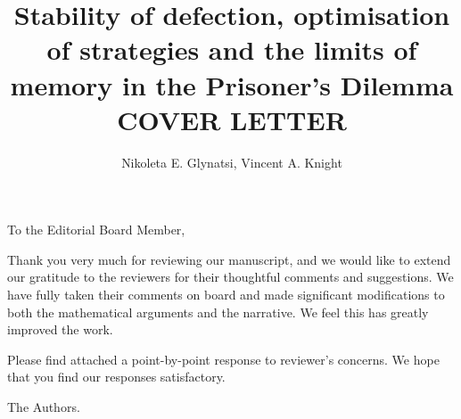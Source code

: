 \documentclass{article}
\title{Stability of defection, optimisation of strategies and the limits of
memory in the Prisoner's Dilemma COVER LETTER}
\author{Nikoleta E. Glynatsi, Vincent A. Knight}
\begin{document}
\maketitle

To the Editorial Board Member,

Thank you very much for reviewing our manuscript, and we would like to extend
our gratitude to the reviewers for their thoughtful comments and suggestions. We
have fully taken their comments on board and made significant modifications to
both the mathematical arguments and the narrative. We feel this has greatly
improved the work.

Please find attached a point-by-point response to reviewer's concerns. We hope
that you find our responses satisfactory.

The Authors.
\end{document}
